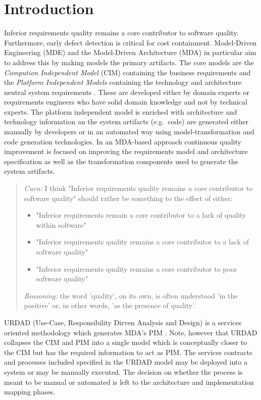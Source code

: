 \section{Introduction}\label{sec:Introduction}

Inferior requirements quality remains a core contributor to software quality\cite{heck_experiences_2008,_strategies_2011}. Furthermore, early defect detection is critical for cost containment\cite{betterRefernceThanBoehm1981WhichReliesOnWaterfall}. Model-Driven Engineering (MDE) and the Model-Driven Architecture (MDA) \cite{frankel_model_2003} in particular aim to address this by making models the primary artifacts. The core models are the \emph{Compution Independent Model} (CIM) containing the business requirements and the \emph{Platform Independent Models} containing the technology and architecture neutral system requirements \cite{needAGoodCitation}. These are developed either by domain experts or requirements engineers who have solid domain knowledge and not by technical experts. The platform independent model is enriched with architecture and technology information an the system artifacts (e.g.\ code) are generated either manually by developers or in an automated way using model-transformation and code generation technologies. In an MDA-based approach continuous quality improvement is focused on improving the requirements model and architecture specification as well as the transformation components used to generate the system artifacts.

\begin{quotation} \emph{Cuen:} I think "Inferior requirements quality remains a core contributor to software quality" should rather be something to the effect of either:

\begin{itemize}
  \item "Inferior requirements remain a core contributor to a lack of quality within software"
  \item "Inferior requirements quality remains a core contributor to a lack of software quality"
  \item "Inferior requirements quality remains a core contributor to poor software quality"
\end{itemize}

\emph{Reasoning:} the word 'quality', on its own, is often understood 'in the positive' or, in other words, 'as the presence of quality'.
\end{quotation}

URDAD (Use-Case, Responsibility Dirven Analysis and Design) \cite{solms_technology_2007} is a services oriented methodology which generates MDA's PIM \cite{solms_generating_2009}. Note, however that URDAD collapses the CIM and PIM into a single model which is conceptually closer to the CIM but has the required information to act as PIM. The services contracts and processes included specified in the URDAD model may be deployed into a system or may be manually executed. The decision on whether the process is meant to be manual or automated is left to the architecture and implementation mapping phases. 

